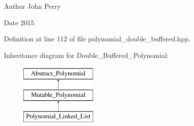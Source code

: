 \begin{DoxyAuthor}{Author}
John Perry 
\end{DoxyAuthor}
\begin{DoxyDate}{Date}
2015 
\end{DoxyDate}


Definition at line 112 of file polynomial\+\_\+double\+\_\+buffered.\+hpp.

Inheritance diagram for Double\+\_\+\+Buffered\+\_\+\+Polynomial\+:\begin{figure}[H]
\begin{center}
\leavevmode
\includegraphics[height=3.000000cm]{group__polygroup}
\end{center}
\end{figure}
